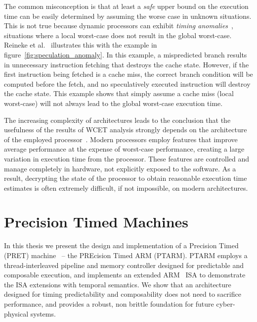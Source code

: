 The common misconception is that at least a \emph{safe} upper bound on the execution time can be easily determined by assuming the worse case in unknown situations.
This is not true because dynamic processors can exhibit \emph{timing anomalies}~\cite{Reineke06adefinition,Lundqvist1999}, situations where a local worst-case does not result in the global worst-case.
Reineke et al.~\cite{Reineke06adefinition} illustrates this with the example in figure~\ref{fig:speculation_anomaly}.
In this example, a mispredicted branch results in unnecessary instruction fetching that destroys the cache state. 
However, if the first instruction being fetched is a cache miss, the correct branch condition will be computed before the fetch, and no speculatively executed instruction will destroy the cache state. 
This example shows that simply assume a cache miss (local worst-case) will not always lead to the global worst-case execution time.    

The increasing complexity of architectures leads to the conclusion that the usefulness of the results of WCET analysis strongly depends on the architecture of the employed processor~\cite{Heckmann2003processor}.
Modern processors employ features that improve average performance at the expense of worst-case performance, creating a large variation in execution time from the processor. 
These features are controlled and manage completely in hardware, not explicitly exposed to the software.
As a result, decrypting the state of the processor to obtain reasonable execution time estimates is often extremely difficult, if not impossible, on modern architectures.   

\section{Precision Timed Machines}
In this thesis we present the design and implementation of a Precision Timed (PRET) machine~\cite{edwards2007case} -- the PREcision Timed ARM (PTARM).
PTARM employs a thread-interleaved pipeline and memory controller designed for predictable and composable execution, and implements an extended ARM~\cite{armrefman} ISA to demonstrate the ISA extensions with temporal semantics.
We show that an architecture designed for timing predictability and composability does not need to sacrifice performance, and provides a robust, non brittle foundation for future cyber-physical systems.       

